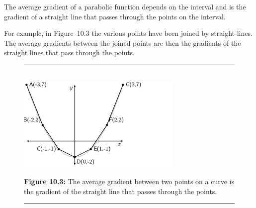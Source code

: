       \par 
      \label{m39223*id190657}The average gradient of a parabolic function depends on the interval and is the gradient of a straight line that passes through the points on the interval.\par 
      \label{m39223*id190661}For example, in Figure~10.3 the various points have been joined by straight-lines. The average gradients between the joined points are then the gradients of the straight lines that pass through the points.\par 
    \setcounter{subfigure}{0}
	\begin{figure}[H] %
    \begin{center}
    \rule[.1in]{\figurerulewidth}{.005in} \\
        \label{m39223*uid3!!!underscore!!!media}\label{m39223*uid3!!!underscore!!!printimage}\includegraphics[width=300px]{col11306.imgs/m39223_MG10C12_003.png} %
      \vspace{2pt}
    \vspace{\rubberspace}\par \begin{cnxcaption}
	  \small \textbf{Figure 10.3: }The average gradient between two points on a curve is the gradient of the straight line that passes through the points.
	\end{cnxcaption}
    \vspace{.1in}
    \rule[.1in]{\figurerulewidth}{.005in} \\
    \end{center}
 \end{figure}       
      \label{m39223*uid4}

